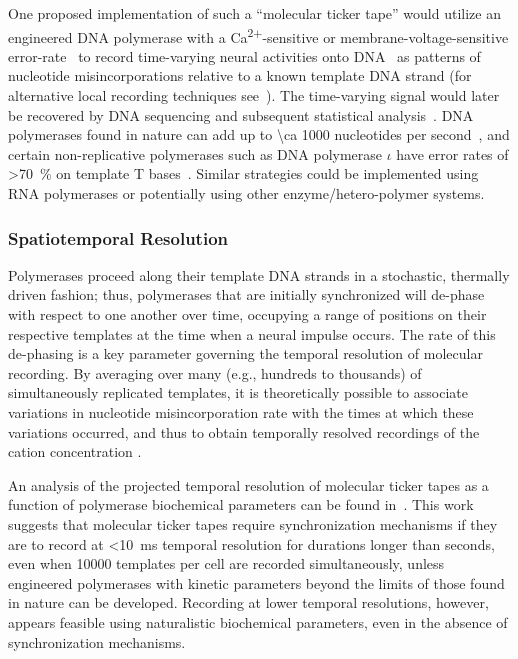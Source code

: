 One proposed implementation of such a ``molecular ticker tape'' would utilize an engineered DNA polymerase with a Ca\textsuperscript{2$+$}-sensitive or membrane-voltage-sensitive error-rate~\cite{zamft12} to record time-varying neural activities onto DNA~\cite{glaser13} as patterns of nucleotide misincorporations relative to a known template DNA strand (for alternative local recording techniques see~\cite{friedland09,bonnet13}).
The time-varying signal would later be recovered by DNA sequencing and subsequent statistical analysis~\cite{glaser13}.
DNA polymerases found in nature can add up to \num{\ca 1000} nucleotides per second~\cite{kelman95}, and certain non-replicative polymerases such as DNA polymerase $\iota$ have error rates of \SI{>70}{\percent} on template T bases~\cite{frank07}.
Similar strategies could be implemented using RNA polymerases or potentially using other enzyme/hetero-polymer systems.

\subsubsection{Spatiotemporal Resolution}

Polymerases proceed along their template DNA strands in a stochastic, thermally driven fashion; thus, polymerases that are initially synchronized will de-phase with respect to one another over time, occupying a range of positions on their respective templates at the time when a neural impulse occurs. The rate of this de-phasing is a key parameter governing the temporal resolution of molecular recording. By averaging over many (e.g., hundreds to thousands) of simultaneously replicated templates, it is theoretically possible to associate variations in nucleotide misincorporation rate with the times at which these variations occurred, and thus to obtain temporally resolved recordings of the cation concentration \cite{glaser13}.

An analysis of the projected temporal resolution of molecular ticker tapes as a function of polymerase biochemical parameters can be found in~\cite{glaser13}.
This work suggests that molecular ticker tapes require synchronization mechanisms if they are to record at \SI{<10}{\ms} temporal resolution for durations longer than seconds, even when \num{10000} templates per cell are recorded simultaneously, unless engineered polymerases with kinetic parameters beyond the limits of those found in nature can be developed.
Recording at lower temporal resolutions, however, appears feasible using naturalistic biochemical parameters, even in the absence of synchronization mechanisms.

